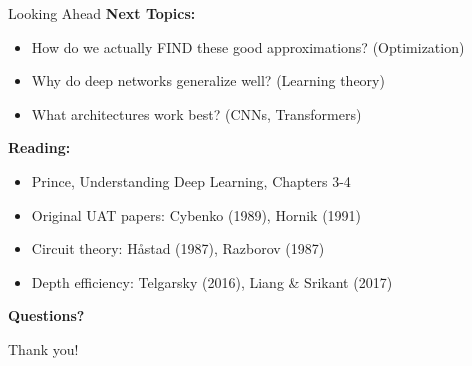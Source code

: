\documentclass[xcolor=svgnames, 10pt, handout, standalone]{beamer}
\newcommand{\1}{\mathbf{1}}
\begin{document}
\begin{frame}{Looking Ahead}
\textbf{Next Topics:}
\begin{itemize}
    \item How do we actually FIND these good approximations? (Optimization)
    \item Why do deep networks generalize well? (Learning theory)
    \item What architectures work best? (CNNs, Transformers)
\end{itemize}

\vspace{0.5cm}

\textbf{Reading:}
\begin{itemize}
    \item Prince, Understanding Deep Learning, Chapters 3-4
    \item Original UAT papers: Cybenko (1989), Hornik (1991)
    \item Circuit theory: Håstad (1987), Razborov (1987)
    \item Depth efficiency: Telgarsky (2016), Liang \& Srikant (2017)
\end{itemize}
\end{frame}

\begin{frame}
\begin{center}
\Huge{\textbf{Questions?}}

\vspace{1cm}

\Large{Thank you!}
\end{center}
\end{frame}
\end{document}
